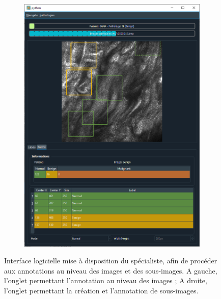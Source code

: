 \begin{figure}[H]
\begin{subfigure}{.45\textwidth}
      \includegraphics[width=\linewidth]{contents/ii_preamble_microscopy/resources/example_gui_annotation_2.png}
    \end{subfigure}
    \caption{Interface logicielle mise à disposition du spécialiste, afin de procéder aux annotations au niveau des images et des sous-images. A gauche, l'onglet permettant l'annotation au niveau des images ; A droite, l'onglet permettant la création et l'annotation de sous-images.}
    \label{fig:example_gui_annotation}
\end{figure}

